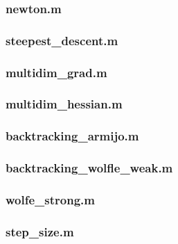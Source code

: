 \documentclass[a4paper,11pt]{article}
\numberwithin{equation}{section} %
\begin{document}
\subsubsection{newton.m}



\subsubsection{steepest\_descent.m}



\subsubsection{multidim\_grad.m}



\subsubsection{multidim\_hessian.m}



\subsubsection{backtracking\_armijo.m}



\subsubsection{backtracking\_wolfle\_weak.m}



\subsubsection{wolfe\_strong.m}



\subsubsection{step\_size.m}


\end{document}
